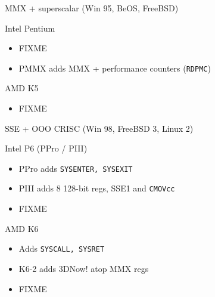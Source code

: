 \documentclass[xcolor={dvipsnames,table}]{beamer}
\begin{document}
\begin{frame}[t]{MMX + superscalar (Win 95, BeOS, FreeBSD)}
\begin{block}{Intel Pentium}
\begin{itemize}
\item FIXME
\item PMMX adds MMX + performance counters (\texttt{RDPMC})
\end{itemize}
\end{block}
\begin{block}{AMD K5}
\begin{itemize}
\item FIXME
\end{itemize}
\end{block}
\vfill
\begin{center}
\end{center}
\end{frame}

\begin{frame}[t]{SSE + OOO CRISC (Win 98, FreeBSD 3, Linux 2)}

\begin{block}{Intel P6 (PPro / PIII)}
\begin{itemize}
\item PPro adds \texttt{SYSENTER, SYSEXIT}
\item PIII adds 8 128-bit regs, SSE1 and \texttt{CMOVcc}
\item FIXME
\end{itemize}
\end{block}
\begin{block}{AMD K6}
\begin{itemize}
\item Adds \texttt{SYSCALL, SYSRET}
\item K6-2 adds 3DNow! atop MMX regs
\item FIXME
\end{itemize}
\end{block}
\vfill
\begin{center}
\end{center}
\end{frame}
\end{document}
